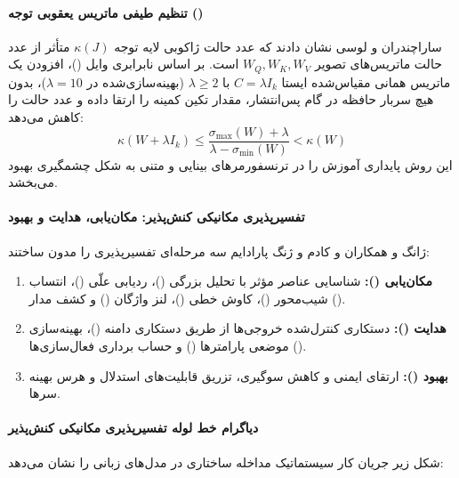\paragraph*{تنظیم طیفی ماتریس یعقوبی توجه ()}
ساراچندران و لوسی \cite{saratchandran2026spectral} نشان دادند که عدد حالت ژاکوبی لایه توجه $\kappa(J)$ متأثر از عدد حالت ماتریس‌های تصویر $W_Q, W_K, W_V$ است. بر اساس نابرابری وایل ()، افزودن یک ماتریس همانی مقیاس‌شده ایستا $C = \lambda I_k$ با $\lambda \ge 2$ (بهینه‌سازی‌شده در $\lambda = 10$)، بدون هیچ سربار حافظه در گام پس‌انتشار، مقدار تکین کمینه را ارتقا داده و عدد حالت را کاهش می‌دهد:
\begin{equation}
    \kappa(W + \lambda I_k) \le \frac{\sigma_{\max}(W) + \lambda}{\lambda - \sigma_{\min}(W)} < \kappa(W)
\end{equation}
این روش پایداری آموزش را در ترنسفورمرهای بینایی و متنی به شکل چشمگیری بهبود می‌بخشد.

\paragraph*{تفسیرپذیری مکانیکی کنش‌پذیر: مکان‌یابی، هدایت و بهبود}
ژانگ و همکاران \cite{zhang2026locate} و کادم و ژنگ \cite{kadem2026interpreting} پارادایم سه مرحله‌ای تفسیرپذیری را مدون ساختند:
\begin{enumerate}
    \item \textbf{مکان‌یابی ():} شناسایی عناصر مؤثر با تحلیل بزرگی ()، ردیابی علّی ()، انتساب شیب‌محور ()، کاوش خطی ()، لنز واژگان () و کشف مدار ().
    \item \textbf{هدایت ():} دستکاری کنترل‌شده خروجی‌ها از طریق دستکاری دامنه ()، بهینه‌سازی موضعی پارامترها () و حساب برداری فعال‌سازی‌ها ().
    \item \textbf{بهبود ():} ارتقای ایمنی و کاهش سوگیری، تزریق قابلیت‌های استدلال و هرس بهینه سرها.
\end{enumerate}

\paragraph*{دیاگرام خط لوله تفسیرپذیری مکانیکی کنش‌پذیر}
شکل زیر جریان کار سیستماتیک مداخله ساختاری در مدل‌های زبانی را نشان می‌دهد:

